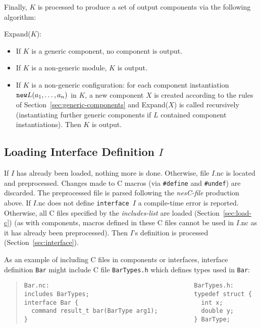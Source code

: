 \documentclass[11pt,letterpaper]{article}
\newcommand{\kw}[1]{{\tt #1}}
\newcommand{\code}[1]{{\tt #1}}
\newcommand{\file}[1]{{\tt #1}}
\begin{document}
Finally, $K$ is processed to produce a set of output components via the
following algorithm:

Expand($K$):
\begin{itemize}
\item If $K$ is a generic component, no component is output.

\item If $K$ is a non-generic module, $K$ is output.

\item If $K$ is a non-generic configuration: for each component
instantiation $\kw{new} L(a_1, \ldots, a_n)$ in $K$, a new component $X$ is
created according to the rules of Section~\ref{sec:generic-components} and
Expand($X$) is called recursively (instantiating further generic components
if $L$ contained component instantiations). Then $K$ is output.
\end{itemize}

\subsection{Loading Interface Definition $I$}
\label{sec:load-intf}

If $I$ has already been loaded, nothing more is done. Otherwise, file
$I$.nc is located and preprocessed. Changes made to C macros (via
\code{\#define} and \code{\#undef}) are discarded. The preprocessed file is
parsed following the \emph{nesC-file} production above. If $I$.nc does not
define \code{interface $I$} a compile-time error is reported. Otherwise,
all C files specified by the \emph{includes-list} are loaded
(Section~\ref{sec:load-c}) (as with components, macros defined in these C
files cannot be used in $I$.nc as it has already been preprocessed). Then
$I$'s definition is processed (Section~\ref{sec:interface}).

As an example of including C files in components or interfaces, interface
definition \code{Bar} might include C file \file{BarTypes.h} which defines types
used in \code{Bar}:

\begin{quote} \begin{verbatim}
Bar.nc:                                        BarTypes.h:      
includes BarTypes;                             typedef struct { 
interface Bar {                                  int x;         
  command result_t bar(BarType arg1);            double y;      
}                                              } BarType;
\end{verbatim} \end{quote}
\end{document}
